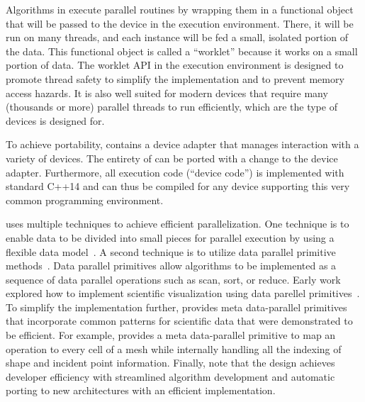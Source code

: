 Algorithms in \vtkm execute parallel routines by wrapping them in a functional object that will be passed to the device in the execution environment. There, it will be run on many threads, and each instance will be fed a small, isolated portion of the data.
This functional object is called a ``worklet'' because it works on a small portion of data.
The worklet API in the execution environment is designed to promote thread safety to simplify the implementation and to prevent memory access hazards.
It is also well suited for modern devices that require many (thousands or more) parallel threads to run efficiently, which are the type of devices \vtkm is designed for.

To achieve portability, \vtkm contains a device adapter that manages interaction with a variety of devices.
The entirety of \vtkm can be ported with a change to the device adapter.
%
Furthermore, all execution code (``device code'') is implemented with standard C++14
and can thus be compiled for any device supporting this very common programming environment.

\vtkm uses multiple techniques to achieve efficient parallelization.
One technique is
to enable data to be divided into small pieces for parallel execution by
using a 
flexible data model~\citep{Meredith2012}.
A second technique is
to utilize
data parallel primitive methods~\citep{Blelloch1990}.
Data parallel primitives allow algorithms to be implemented as a sequence of data parallel operations such as scan, sort, or reduce.
Early work explored how to implement scientific visualization using data parellel primitives~\citep{Lo2012}.
To simplify the implementation further, \vtkm provides meta data-parallel primitives~\citep{Moreland2021} that incorporate common patterns for scientific data that were demonstrated to be efficient.
For example, \vtkm provides a meta data-parallel primitive to map an operation to every cell of a mesh while internally handling all the indexing of shape and incident point information.
Finally, note that the \vtkm design achieves developer efficiency with 
streamlined algorithm development and 
automatic
porting to new architectures with an efficient implementation.
